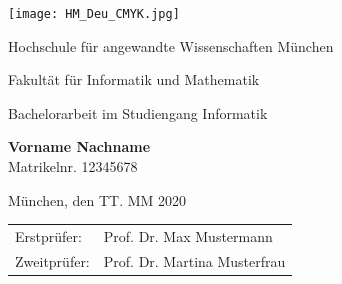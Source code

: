 

\pagestyle{empty}
\overfullrule=3pt


\begin{titlepage}
	\centering
	\setlength{\parindent}{0pt}
	
	\singlespacing
	
	\begin{flushright}
		\texttt{[image: HM\_Deu\_CMYK.jpg]}
	\end{flushright}
	
	\vspace*{10mm}
	
	\begin{Huge}
		Hochschule für angewandte Wissenschaften München \\
	\end{Huge}

	\vspace{10mm}

	\begin{Large}
		Fakultät für Informatik und Mathematik \\
	\end{Large}
	
	\vspace{20mm}
	
	{
		\doublespacing
		\large
		\sffamily
		\bfseries
		\begin{Huge}
		\end{Huge}
		\par
	}

	\singlespacing

	\vspace{20mm}
	\normalfont
	Bachelorarbeit im Studiengang Informatik
	
	\vspace{20mm}
	\textsf{\textbf{Vorname Nachname}}\\
	Matrikelnr. 12345678
	
	\vspace{0.5\baselineskip}
	München, den TT. MM 2020
	
	\vfill
	
	\begin{tabular}{@{}ll}
		Erstprüfer: & Prof. Dr. Max Mustermann \\
		Zweitprüfer: & Prof. Dr. Martina Musterfrau \\
	\end{tabular}

\end{titlepage}



